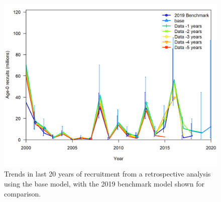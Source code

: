 \documentclass[11pt,
  english,
  a4paper,
]{article}
\begin{document}
\tagmcend\tagstructend


\begin{figure}
\centering
\includegraphics[width=1\textwidth,height=0.5\textheight]{figs/retro_bench_rec.png}
\caption{Trends in last 20 years of recruitment from a retrospective analysis using the base model, with the 2019 benchmark model shown for comparison.\label{fig:retrobenchREC}}
\end{figure}

\tagmcend\tagstructend

\end{document}
